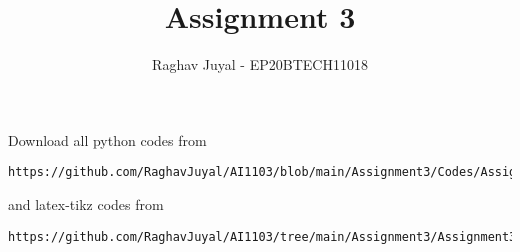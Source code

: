 \documentclass[journal,12pt,twocolumn]{IEEEtran}
\begin{document}
\let\vec\mathbf
\renewcommand{\thefigure}{\theproblem}
\def\putbox#1#2#3{\makebox[0in][l]{\makebox[#1][l]{}\raisebox{\baselineskip}[0in][0in]{\raisebox{#2}[0in][0in]{#3}}}}
     \def\rightbox#1{\makebox[0in][r]{#1}}
     \def\centbox#1{\makebox[0in]{#1}}
     \def\topbox#1{\raisebox{-\baselineskip}[0in][0in]{#1}}
     \def\midbox#1{\raisebox{-0.5\baselineskip}[0in][0in]{#1}}
\vspace{3cm}
\title{Assignment 3}
\author{Raghav Juyal - EP20BTECH11018}
\maketitle
\newpage
\bigskip
\renewcommand{\thefigure}{\theenumi}
\renewcommand{\thetable}{\theenumi}
Download all python codes from 
\begin{lstlisting}
https://github.com/RaghavJuyal/AI1103/blob/main/Assignment3/Codes/Assignment3.py
\end{lstlisting}
%
and latex-tikz codes from 
%
\begin{lstlisting}
https://github.com/RaghavJuyal/AI1103/tree/main/Assignment3/Assignment3.tex
\end{lstlisting}
\end{document}
